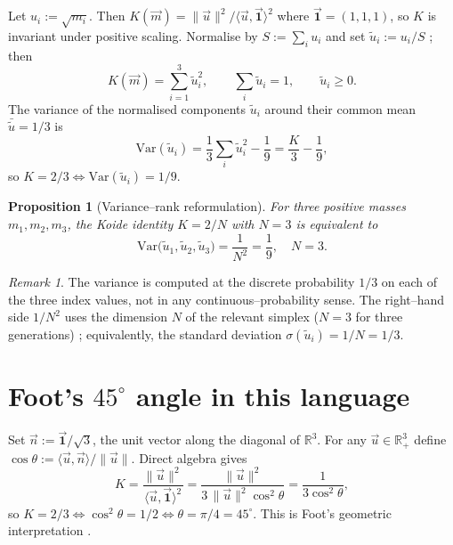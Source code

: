 \documentclass[11pt,a4paper]{article}
\newtheorem{proposition}[theorem]{Proposition}
\theoremstyle{remark}
\newtheorem*{remark}{Remark}
\begin{document}
Let $u_i := \sqrt{m_i}$. Then $K(\vec m) = \|\vec u\|^2 / \langle \vec u, \vec{\mathbf{1}}\rangle^2$ where $\vec{\mathbf{1}} = (1, 1, 1)$, so $K$ is invariant under positive scaling. Normalise by $S := \sum_i u_i$ and set $\tilde u_i := u_i / S$ ; then
\begin{equation}
K(\vec m) = \sum_{i=1}^3 \tilde u_i^2, \qquad \sum_i \tilde u_i = 1, \qquad \tilde u_i \ge 0.
\label{eq:K-as-sum-squares}
\end{equation}
The variance of the normalised components $\tilde u_i$ around their common mean $\bar{\tilde u} = 1/3$ is
\begin{equation}
\mathrm{Var}(\tilde u_i) = \frac{1}{3}\sum_i \tilde u_i^2 - \frac{1}{9} = \frac{K}{3} - \frac{1}{9},
\end{equation}
so $K = 2/3 \iff \mathrm{Var}(\tilde u_i) = 1/9$.

\begin{proposition}[Variance--rank reformulation]
\label{prop:variance-rank}
For three positive masses $m_1, m_2, m_3$, the Koide identity $K = 2/N$ with $N = 3$ is equivalent to
\begin{equation}
\boxed{\;\mathrm{Var}\big(\tilde u_1, \tilde u_2, \tilde u_3\big) = \frac{1}{N^2} = \frac{1}{9}, \quad N = 3.\;}
\label{eq:variance-rank}
\end{equation}
\end{proposition}

\begin{remark}
The variance is computed at the discrete probability $1/3$ on each of the three index values, not in any continuous--probability sense. The right--hand side $1/N^2$ uses the dimension $N$ of the relevant simplex ($N = 3$ for three generations) ; equivalently, the standard deviation $\sigma(\tilde u_i) = 1/N = 1/3$.
\end{remark}

\section{Foot's $45^\circ$ angle in this language}

Set $\vec n := \vec{\mathbf{1}}/\sqrt 3$, the unit vector along the diagonal of $\mathbb{R}^3$. For any $\vec u \in \mathbb{R}^3_+$ define $\cos\theta := \langle \vec u, \vec n\rangle / \|\vec u\|$. Direct algebra gives
\begin{equation}
K = \frac{\|\vec u\|^2}{\langle \vec u, \vec{\mathbf{1}}\rangle^2} = \frac{\|\vec u\|^2}{3 \, \|\vec u\|^2 \cos^2\theta} = \frac{1}{3\cos^2\theta},
\end{equation}
so $K = 2/3 \iff \cos^2\theta = 1/2 \iff \theta = \pi/4 = 45^\circ$. This is Foot's geometric interpretation \cite{Foot1994}.
\end{document}
